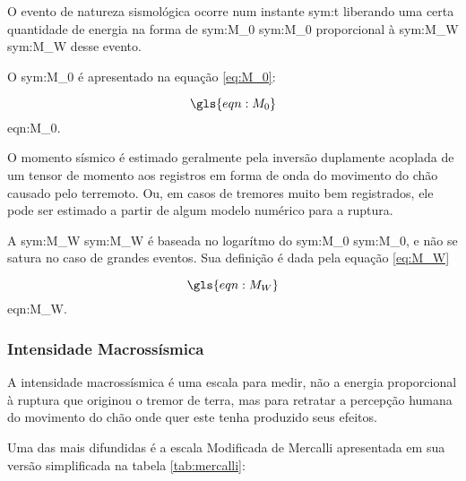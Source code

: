 O evento de natureza sismológica ocorre num
instante \gls{sym:t} liberando uma certa quantidade de energia na forma de \glsdesc{sym:M_0}
\gls{sym:M_0} proporcional à \glsdesc{sym:M_W} \gls{sym:M_W} desse evento.

O \glsdesc{sym:M_0} é apresentado na equação \ref{eq:M_0}:

\begin{equation}
	\gls{eqn:M_0}
	\label{eq:M_0}
\end{equation}
\glsdesc*{eqn:M_0}.

O momento sísmico é estimado geralmente pela inversão duplamente acoplada de um tensor de momento aos registros em 
forma de onda do movimento do chão causado pelo terremoto. Ou, em casos de tremores muito bem registrados, ele pode
ser estimado a partir de algum modelo numérico para a ruptura.

A \glsdesc{sym:M_W} \gls{sym:M_W} \citep{hanks_1999} é baseada no 
logarítmo do \glsdesc{sym:M_0} \gls{sym:M_0}, e não se satura no caso de grandes eventos. 
Sua definição é dada pela equação \ref{eq:M_W} 

\begin{equation}
	\gls{eqn:M_W}
	\label{eq:M_W}
\end{equation}
\glsdesc*{eqn:M_W}.


\subsubsection{Intensidade Macrossísmica}
\label{sec:intensidade}

A intensidade macrossísmica é uma escala para medir, não a energia proporcional
à ruptura que originou o tremor de terra, mas para retratar a percepção humana do
movimento do chão onde quer este tenha produzido seus efeitos.

Uma das mais difundidas é a escala Modificada de Mercalli \citep{richter_1958} apresentada em sua versão simplificada 
na tabela \ref{tab:mercalli}:

